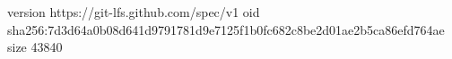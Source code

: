 version https://git-lfs.github.com/spec/v1
oid sha256:7d3d64a0b08d641d9791781d9e7125f1b0fc682c8be2d01ae2b5ca86efd764ae
size 43840

